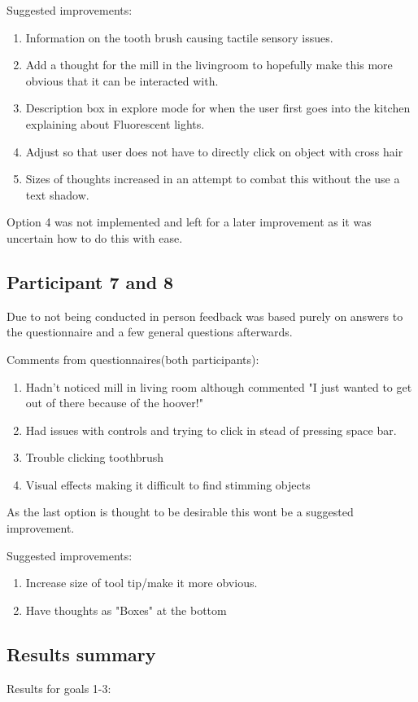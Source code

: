 \documentclass[11pt]{report}
\begin{document}
Suggested improvements:
\begin{enumerate}
\item Information on the tooth brush causing tactile sensory issues. 
\item Add a thought for the mill in the livingroom to hopefully make this more obvious that it can be interacted with. 
\item Description box in explore mode for when the user first goes into the kitchen explaining about Fluorescent lights. 
\item Adjust so that user does not have to directly click on object with cross hair
\item Sizes of thoughts increased in an attempt to combat this without the use a text shadow. 
\end{enumerate}

Option 4 was not implemented and left for a later improvement as it was uncertain how to do this with ease. 

\subsection*{Participant 7 and 8}
Due to not being conducted in person feedback was based purely on answers to the questionnaire and a few general questions afterwards. 

Comments from questionnaires(both participants):
\begin{enumerate}
\item Hadn't noticed mill in living room although commented "I just wanted to get out of there because of the hoover!"
\item Had issues with controls and trying to click in stead of pressing space bar.
\item Trouble clicking toothbrush
\item Visual effects making it difficult to find stimming objects
\end{enumerate}

As the last option is thought to be desirable this wont be a suggested improvement. 

Suggested improvements:
\begin{enumerate}
\item Increase size of tool tip/make it more obvious.
\item Have thoughts as "Boxes" at the bottom
\end{enumerate}

\subsection*{Results summary}
Results for goals 1-3:
\end{document}
